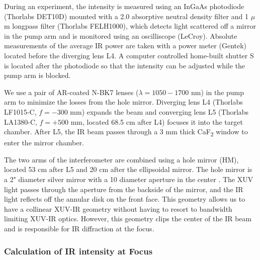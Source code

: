 During an experiment, the intensity is measured using an InGaAs photodiode (Thorlabs DET10D) mounted with a 2.0 absorptive neutral density filter and 1 $\mu$m longpass filter (Thorlabs FELH1000), which detects light scattered off a mirror in the pump arm and is monitored using an oscilliscope (LeCroy). Absolute measurements of the average IR power are taken with a power meter (Gentek) located before the diverging lens L4. A computer controlled home-built shutter S is located after the photodiode so that the intensity can be adjusted while the pump arm is blocked.

We use a pair of AR-coated N-BK7 lenses ($\lambda = 1050-1700$ nm) in the pump arm to minimize the losses from the hole mirror. Diverging lens L4 (Thorlabs LF1015-C, $f = - 300$ mm) expands the beam and converging lens L5 (Thorlabs LA1380-C, $f = + 500$ mm, located 68.5 cm after L4) focuses it into the target chamber. After L5, the IR beam passes through a 3 mm thick CaF\textsubscript{2} window to enter the mirror chamber.

The two arms of the interferometer are combined using a hole mirror (HM), located 53 cm after L5 and 20 cm after the ellipsoidal mirror. The hole mirror is a 2" diameter silver mirror with a 10 diameter aperture in the center \cite{peatrossHighorderHarmonicGeneration1994}. The XUV light passes through the aperture from the backside of the mirror, and the IR light reflects off the annular disk on the front face. This geometry allows us to have a collinear XUV-IR geometry without having to resort to bandwidth limiting XUV-IR optics. However, this geometry clips the center of the IR beam and is responsible for IR diffraction at the focus.

\subsubsection{Calculation of IR intensity at Focus}

